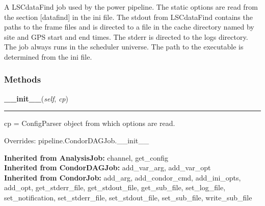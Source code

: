 A LSCdataFind job used by the power pipeline. The static options are read 
from the section [datafind] in the ini file. The stdout from LSCdataFind 
contains the paths to the frame files and is directed to a file in the 
cache directory named by site and GPS start and end times. The stderr is 
directed to the logs directory. The job always runs in the scheduler 
universe. The path to the executable is determined from the ini file.



  \subsubsection{Methods}

    \label{power:DataFindJob:__init__}
    \vspace{0.5ex}

    \begin{boxedminipage}{\textwidth}

    \raggedright \textbf{\_\_init\_\_}(\textit{self}, \textit{cp})

    \vspace{-1.5ex}

    \rule{\textwidth}{0.5\fboxrule}
    cp = ConfigParser object from which options are read.

    \vspace{1ex}

      Overrides: pipeline.CondorDAGJob.\_\_init\_\_

    \end{boxedminipage}

  \textbf{Inherited from AnalysisJob:}
    channel,
    get\_config
    \\
  \textbf{Inherited from CondorDAGJob:}
    add\_var\_arg,
    add\_var\_opt
    \\
  \textbf{Inherited from CondorJob:}
    add\_arg,
    add\_condor\_cmd,
    add\_ini\_opts,
    add\_opt,
    get\_stderr\_file,
    get\_stdout\_file,
    get\_sub\_file,
    set\_log\_file,
    set\_notification,
    set\_stderr\_file,
    set\_stdout\_file,
    set\_sub\_file,
    write\_sub\_file

